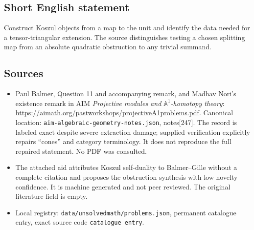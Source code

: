 \documentclass[11pt]{article}
\newcommand{\A}{\mathbb{A}}
\begin{document}
\subsection{Short English statement}
Construct Koszul objects from a map to the unit and identify the data needed for a tensor-triangular extension. The source distinguishes testing a chosen splitting map from an absolute quadratic obstruction to any trivial summand.
\subsection{Sources}
\begin{itemize}
\item Paul Balmer, Question 11 and accompanying remark, and Madhav Nori's existence remark in AIM \emph{Projective modules and $\A^1$-homotopy theory}: \url{https://aimath.org/pastworkshops/projectiveA1problems.pdf}. Canonical location: \texttt{aim-algebraic-geometry-notes.json}, notes[247]. The record is labeled exact despite severe extraction damage; supplied verification explicitly repairs ``cones'' and category terminology. It does not reproduce the full repaired statement. No PDF was consulted.
\item The attached aid attributes Koszul self-duality to Balmer--Gille without a complete citation and proposes the obstruction synthesis with low novelty confidence. It is machine generated and not peer reviewed. The original literature field is empty.
\item Local registry: \texttt{data/unsolvedmath/problems.json}, permanent catalogue entry, exact source code \texttt{catalogue entry}.
\end{itemize}
\end{document}
